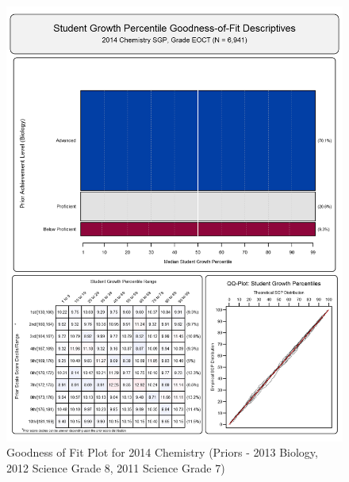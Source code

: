 \documentclass[12pt]{article}
\begin{document}
\begin{figure}[htbp]
\centering
\includegraphics{../img/Goodness_of_Fit/CHEMISTRY.2014/2014_CHEMISTRY_EOCT;2013_BIOLOGY_EOCT;2012_SCIENCE_8;2011_SCIENCE_7.png}
\caption{Goodness of Fit Plot for 2014 Chemistry (Priors - 2013 Biology,
2012 Science Grade 8, 2011 Science Grade 7)}
\end{figure}
\end{document}
